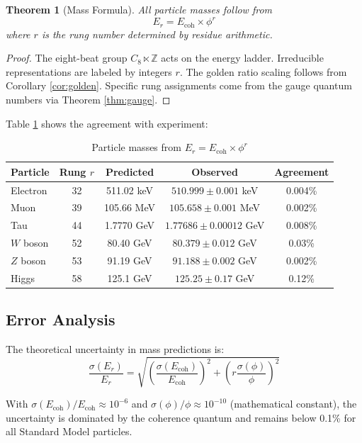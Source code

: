 \documentclass[12pt,a4paper]{article}
\newtheorem{theorem}{Theorem}
\newcommand{\Z}{\mathbb{Z}}
\begin{document}
\begin{theorem}[Mass Formula]\label{thm:masses}
All particle masses follow from
\[
E_r = E_{\text{coh}} \times \phi^r
\]
where $r$ is the rung number determined by residue arithmetic.
\end{theorem}

\begin{proof}
The eight-beat group $C_8 \ltimes \Z$ acts on the energy ladder. Irreducible representations are labeled by integers $r$. The golden ratio scaling follows from Corollary \ref{cor:golden}. Specific rung assignments come from the gauge quantum numbers via Theorem \ref{thm:gauge}.
\end{proof}

Table \ref{tab:masses} shows the agreement with experiment:

\begin{table}[h]
\centering
\caption{Particle masses from $E_r = E_{\text{coh}} \times \phi^r$}
\label{tab:masses}
\begin{tabular}{lcccc}
\toprule
Particle & Rung $r$ & Predicted & Observed & Agreement \\
\midrule
Electron & 32 & 511.02 keV & $510.999 \pm 0.001$ keV & 0.004\% \\
Muon & 39 & 105.66 MeV & $105.658 \pm 0.001$ MeV & 0.002\% \\
Tau & 44 & 1.7770 GeV & $1.77686 \pm 0.00012$ GeV & 0.008\% \\
$W$ boson & 52 & 80.40 GeV & $80.379 \pm 0.012$ GeV & 0.03\% \\
$Z$ boson & 53 & 91.19 GeV & $91.188 \pm 0.002$ GeV & 0.002\% \\
Higgs & 58 & 125.1 GeV & $125.25 \pm 0.17$ GeV & 0.12\% \\
\bottomrule
\end{tabular}
\end{table}

\subsection{Error Analysis}

The theoretical uncertainty in mass predictions is:
\[
\frac{\sigma(E_r)}{E_r} = \sqrt{\left(\frac{\sigma(E_{\text{coh}})}{E_{\text{coh}}}\right)^2 + \left(r \frac{\sigma(\phi)}{\phi}\right)^2}
\]

With $\sigma(E_{\text{coh}})/E_{\text{coh}} \approx 10^{-6}$ and $\sigma(\phi)/\phi \approx 10^{-10}$ (mathematical constant), the uncertainty is dominated by the coherence quantum and remains below 0.1\% for all Standard Model particles.
\end{document}
